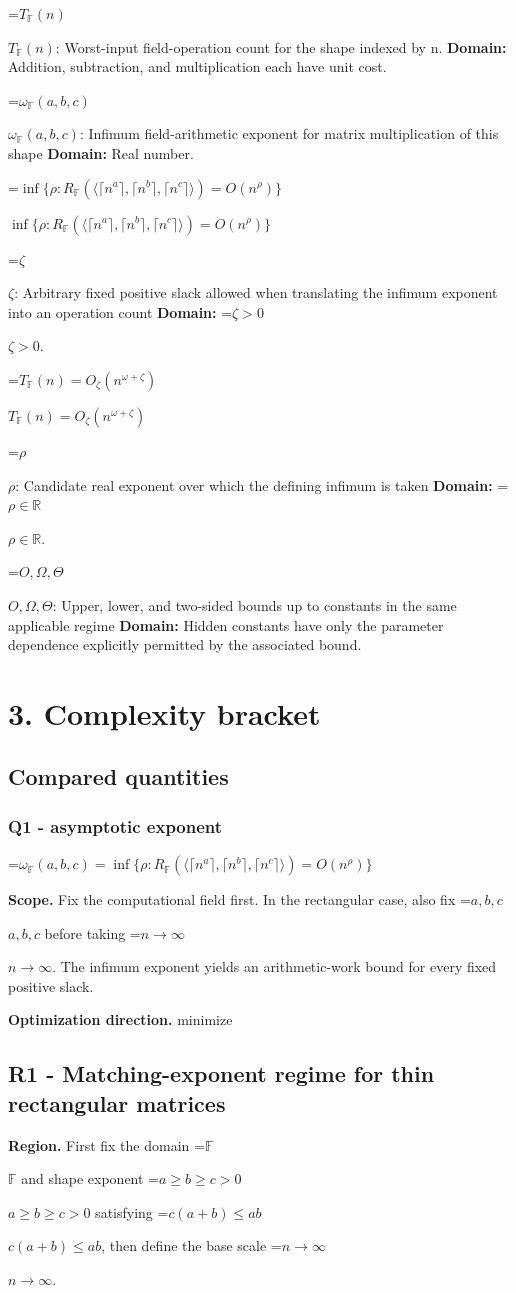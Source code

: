 \documentclass[10pt,a4paper]{article}
\newcommand{\AtlasMath}[1]{\par\begingroup\centering\setbox0=\hbox{$\displaystyle #1$}\ifdim\wd0>1.4\linewidth\typeout{ATLAS WIDE FORMULA: \the\wd0}\fi\ifdim\wd0>\linewidth\resizebox{\linewidth}{!}{\box0}\else\box0\fi\par\endgroup}
\newcommand{\AtlasInlineMath}[1]{\begingroup\setbox0=\hbox{$#1$}\ifdim\wd0>.4\linewidth\endgroup\AtlasMath{#1}\else\endgroup$#1$\fi}
\begin{document}
\AtlasInlineMath{T_{\mathbb F}(n)}: Worst-input field-operation count for the shape indexed by n. \textbf{Domain:} Addition, subtraction, and multiplication each have unit cost.

\AtlasInlineMath{\omega_{\mathbb F}(a,b,c)}: Infimum field-arithmetic exponent for matrix multiplication of this shape \textbf{Domain:} Real number.

\AtlasInlineMath{\inf\{\rho:R_{\mathbb F}(\langle\lceil n^a\rceil,\lceil n^b\rceil,\lceil n^c\rceil\rangle)=O(n^\rho)\}}

\AtlasInlineMath{\zeta}: Arbitrary fixed positive slack allowed when translating the infimum exponent into an operation count \textbf{Domain:} \AtlasInlineMath{\zeta>0}.

\AtlasInlineMath{T_{\mathbb F}(n)=O_\zeta(n^{\omega+\zeta})}

\AtlasInlineMath{\rho}: Candidate real exponent over which the defining infimum is taken \textbf{Domain:} \AtlasInlineMath{\rho\in\mathbb R}.

\AtlasInlineMath{O,\Omega,\Theta}: Upper, lower, and two-sided bounds up to constants in the same applicable regime \textbf{Domain:} Hidden constants have only the parameter dependence explicitly permitted by the associated bound.

\section{3. Complexity bracket}
\subsection{Compared quantities}
\subsubsection{Q1 - asymptotic exponent}
\AtlasMath{\omega_{\mathbb F}(a,b,c)=\inf\{\rho:R_{\mathbb F}(\langle\lceil n^a\rceil,\lceil n^b\rceil,\lceil n^c\rceil\rangle)=O(n^\rho)\}}
\textbf{Scope.} Fix the computational field first. In the rectangular case, also fix \AtlasInlineMath{a,b,c} before taking \AtlasInlineMath{n\to\infty}. The infimum exponent yields an arithmetic-work bound for every fixed positive slack.

\textbf{Optimization direction.} minimize

\subsection{R1 - Matching-exponent regime for thin rectangular matrices}
\textbf{Region.} First fix the domain \AtlasInlineMath{\mathbb{F}} and shape exponent \AtlasInlineMath{a\ge b\ge c>0} satisfying \AtlasInlineMath{c(a+b)\le ab}, then define the base scale \AtlasInlineMath{n\to\infty}.
\end{document}
